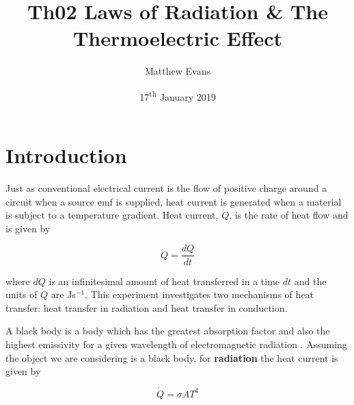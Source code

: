 \documentclass{article}
\begin{document}
\title{Th02 Laws of Radiation \& The Thermoelectric Effect} %
\author{Matthew Evans}%
\date{17\textsuperscript{th} January 2019} %
\maketitle %



\section{Introduction}
\label{sec:introduction}

Just as conventional electrical current is the flow of positive charge around a circuit when a source emf is supplied, heat current is generated when a material is subject to a temperature gradient. Heat current, $\dot{Q}$, is the rate of heat flow and is given by

\begin{equation}
\label{eq:Heat-Current}
\dot{Q} = \frac{dQ}{dt}
\end{equation}

\vspace{2mm}
\noindent
where $dQ$ is an infinitesimal amount of heat transferred in a time $dt$ and the units of $\dot{Q}$ are Js$^{-1}$. This experiment investigates two mechanisms of heat transfer: heat transfer in radiation and heat transfer in conduction.

\vspace{2mm}
\noindent
A black body is a body which has the greatest absorption factor and also the highest emissivity for a given wavelength of electromagnetic radiation \cite{Paper01}. %
Assuming the object we are considering is a black body, for \textbf{radiation} the heat current is given by

\begin{equation}
\label{eq:SB-Law}
\dot{Q} = \sigma AT^4
\end{equation}
\end{document}
